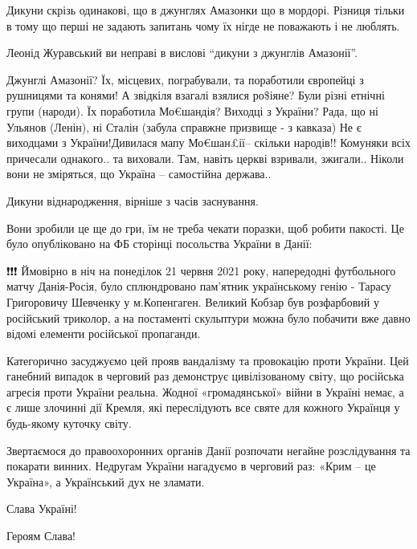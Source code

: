 \begin{itemize}
\begin{itemize}
\end{itemize}


Дикуни скрізь одинакові, що в джунглях Амазонки що в мордорі. Різниця тільки в
тому що перші не задають запитань чому їх нігде не поважають і не люблять.


Леонід Журавський ви неправі в вислові \enquote{дикуни з джунглів Амазонії}.


Джунглі Амазонії? Їх, місцевих, пограбували, та поработили європейці з
рушницями та конями! А звідкіля взагалі взялися ро\$іяне? Були різні етнічні
групи (народи). Їх поработила Мо€шандія? Виходці з України? Рада, що ні Ульянов
(Ленін), ні Сталін (забула справжне призвище - з кавказа) Не є виходцами з
України!Дивилася мапу Мо€шан£ії-- скільки народів!! Комуняки всіх причесали
однакого.. та виховали. Там, навіть церкві взривали, зжигали.. Ніколи вони не
зміряться, що Україна -- самостійна держава..

Дикуни віднародження, вірніше з часів заснування.


Вони зробили це ще до гри, їм не треба чекати поразки, щоб робити пакості. Це було опубліковано на ФБ сторінці посольства України в Данії:

❗️❗️❗️ Ймовірно в ніч на понеділок 21 червня 2021 року, напередодні футбольного
матчу Данія-Росія, було сплюндровано пам’ятник українському генію - Тарасу
Григоровичу Шевченку у м.Копенгаген. Великий Кобзар був розфарбовий у
російський триколор, а на постаменті скульптури можна було побачити вже давно
відомі елементи російської пропаганди.

Категорично засуджуємо цей прояв вандалізму та провокацію проти України. Цей
ганебний випадок в черговий раз демонструє цивілізованому світу, що російська
агресія проти України реальна. Жодної «громадянської» війни в Україні немає, а
є лише злочинні дії Кремля, які переслідують все святе для кожного Українця у
будь-якому куточку світу.

Звертаємося до правоохоронних органів Данії розпочати негайне розслідування та
покарати винних. Недругам України нагадуємо в черговий раз: «Крим – це
Україна», а Український дух не зламати.

Слава Україні!

Героям Слава!


\end{itemize}

